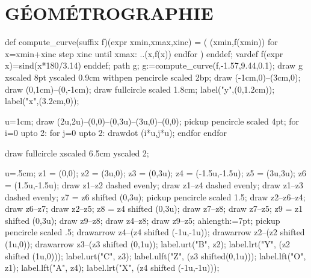 \documentclass[12pt,a4paper,twocolumn]{book} %
\begin{document}
\section{GÉOMÉTROGRAPHIE}
\begin{mpdisplay}
def compute_curve(suffix f)(expr xmin,xmax,xinc) = ( (xmin,f(xmin))
    for x=xmin+xinc step xinc until xmax: ..(x,f(x)) endfor )
enddef;
vardef f(expr x)=sind(x*180/3.14) enddef;
path g;
g:=compute_curve(f,-1.57,9.44,0.1);
draw g xscaled 8pt yscaled 0.9cm withpen pencircle scaled 2bp;
draw (-1cm,0)--(3cm,0);
draw (0,1cm)--(0,-1cm);
draw fullcircle scaled 1.8cm;
label("y",(0,1.2cm));
label("x",(3.2cm,0));
\end{mpdisplay}
\begin{mpdisplay}
u=1cm;
draw (2u,2u)--(0,0)--(0,3u)--(3u,0)--(0,0);
pickup pencircle scaled 4pt;
for i=0 upto 2:
for j=0 upto 2: drawdot (i*u,j*u); endfor
endfor
\end{mpdisplay}




\begin{mpdisplay}
draw fullcircle xscaled 6.5cm yscaled 2\mpdim\baselineskip;
\end{mpdisplay}

\begin{mpdisplay}
u=.5cm;
z1 = (0,0);
z2 = (3u,0);
z3 = (0,3u);
z4 = (-1.5u,-1.5u);
z5 = (3u,3u);
z6 = (1.5u,-1.5u);
draw z1--z2 dashed evenly;
draw z1--z4 dashed evenly;
draw z1--z3 dashed evenly;
z7 = z6 shifted (0,3u);
pickup pencircle scaled 1.5;
draw z2--z6--z4;
draw z6--z7;
draw z2--z5;
z8 = z4 shifted (0,3u);
draw z7--z8;
draw z7--z5;
z9 = z1 shifted (0,3u);
draw z9--z8;
draw z4--z8;
draw z9--z5;
ahlength:=7pt;
pickup pencircle scaled .5;
drawarrow z4--(z4 shifted (-1u,-1u));
drawarrow z2--(z2 shifted (1u,0));
drawarrow z3--(z3 shifted (0,1u));
label.urt("B", z2);
label.lrt("Y", (z2 shifted (1u,0)));
label.urt("C", z3);
label.ulft("Z", (z3 shifted(0,1u)));
label.lft("O", z1);
label.lft("A", z4);
label.lrt("X", (z4 shifted (-1u,-1u)));
\end{mpdisplay}
\end{document}
